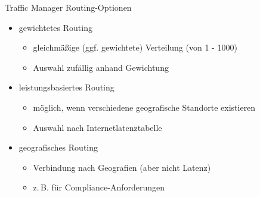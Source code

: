 \begin{flashcard}[Definition]{Traffic Manager Routing-Optionen}
    \begin{itemize}
        \item gewichtetes Routing
            \begin{itemize}
                \item gleichmäßige (ggf. gewichtete) Verteilung\newline
                    (von 1 - 1000)
                \item Auswahl zufällig anhand Gewichtung
            \end{itemize}
        \item leistungsbasiertes Routing
            \begin{itemize}
                \item möglich, wenn verschiedene geografische Standorte existieren
                \item Auswahl nach Internetlatenztabelle
            \end{itemize}
        \item geografisches Routing
            \begin{itemize}
                \item Verbindung nach Geografien (aber nicht Latenz)
                \item z.\,B. für Compliance-Anforderungen
            \end{itemize}
    \end{itemize}
\end{flashcard}

